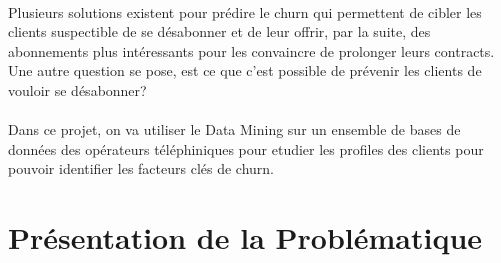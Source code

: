 \documentclass{article}
\begin{document}
\paragraph{}
        Plusieurs solutions existent pour prédire le churn qui
        permettent de cibler les clients suspectible de se désabonner et de leur offrir, par la suite,
        des abonnements plus intéressants pour les convaincre de prolonger leurs contracts. Une autre 
        question se pose, est ce que c'est possible de prévenir les clients de vouloir se désabonner? 
\paragraph{}        
        Dans ce projet, on va utiliser le Data Mining sur un ensemble de bases de données des 
        opérateurs téléphiniques pour etudier les profiles des clients pour pouvoir identifier les
        facteurs clés de churn.
\newpage

\section{Présentation de la Problématique}
\end{document}
